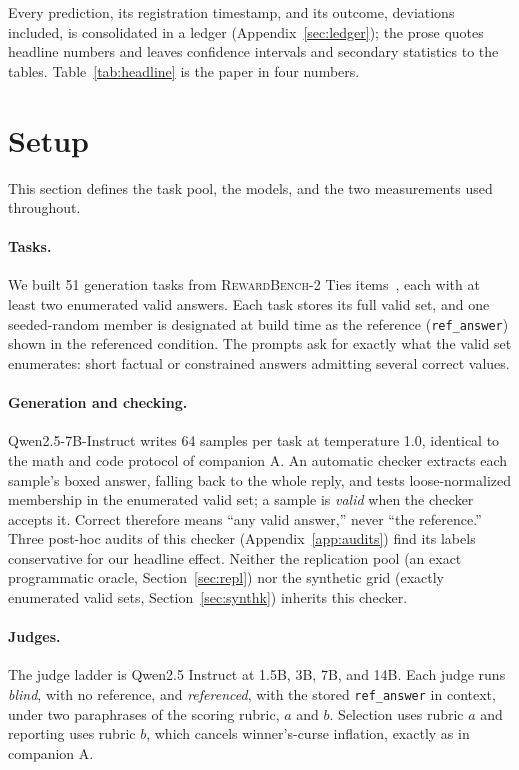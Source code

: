 \documentclass[11pt]{article}
\begin{document}
Every prediction, its registration timestamp, and its outcome, deviations included, is consolidated in a ledger (Appendix~\ref{sec:ledger}); the prose quotes headline numbers and leaves confidence intervals and secondary statistics to the tables.
Table~\ref{tab:headline} is the paper in four numbers.

\section{Setup}
\label{sec:setup}

This section defines the task pool, the models, and the two measurements used throughout.

\paragraph{Tasks.}
We built 51 generation tasks from \textsc{RewardBench-2} Ties items~\cite{malik2025rewardbench2}, each with at least two enumerated valid answers.
Each task stores its full valid set, and one seeded-random member is designated at build time as the reference (\texttt{ref\_answer}) shown in the referenced condition.
The prompts ask for exactly what the valid set enumerates: short factual or constrained answers admitting several correct values.

\paragraph{Generation and checking.}
Qwen2.5-7B-Instruct writes 64 samples per task at temperature 1.0, identical to the math and code protocol of companion A.
An automatic checker extracts each sample's boxed answer, falling back to the whole reply, and tests loose-normalized membership in the enumerated valid set; a sample is \emph{valid} when the checker accepts it.
Correct therefore means ``any valid answer,'' never ``the reference.''
Three post-hoc audits of this checker (Appendix~\ref{app:audits}) find its labels conservative for our headline effect.
Neither the replication pool (an exact programmatic oracle, Section~\ref{sec:repl}) nor the synthetic grid (exactly enumerated valid sets, Section~\ref{sec:synthk}) inherits this checker.

\paragraph{Judges.}
The judge ladder is Qwen2.5 Instruct at 1.5B, 3B, 7B, and 14B.
Each judge runs \emph{blind}, with no reference, and \emph{referenced}, with the stored \texttt{ref\_answer} in context, under two paraphrases of the scoring rubric, $a$ and $b$.
Selection uses rubric $a$ and reporting uses rubric $b$, which cancels winner's-curse inflation, exactly as in companion A.
\end{document}

